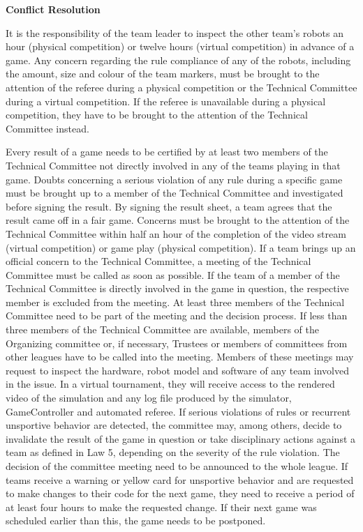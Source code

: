 \bigskip


{\bfseries Conflict Resolution}

\headlinebox

It is the responsibility of the team leader to inspect the other team's
robots an hour (physical competition) or twelve hours (virtual competition) in advance of a game.
Any concern regarding the rule compliance of any of the
robots, including the amount, size and colour of the team markers, must be
brought to the attention of the referee during a physical competition or the Technical Committee during a virtual competition.
If the referee is unavailable during a physical competition, they have to be brought to the attention
  of the Technical Committee instead.



\bigskip

Every result of a game needs to be certified by at least two members of the Technical Committee not directly involved in any of the teams playing in that game.
Doubts concerning a serious violation of any rule during a specific game must be
brought up to a member of the Technical Committee and investigated before
signing the result.
By signing the result sheet, a team agrees that the result came off in
a fair game.
Concerns must be brought to the attention of the Technical Committee
  within half an hour of the completion of the video stream (virtual competition) or game play (physical competition).
If a team brings up an official concern to the Technical Committee, a meeting of
the Technical Committee must be called as soon as possible.
If the team of a member of the Technical Committee is directly involved in the
game in question, the respective member is excluded from the meeting.
At least three members of the Technical Committee need to be part of the meeting
and the decision process.
If less than three members of the Technical Committee are available,
members of the Organizing committee or, if necessary,
Trustees or members of committees from other leagues have to be called into the
meeting.
Members of these meetings may request to inspect the hardware,
robot model and software of any team involved in the issue.
In a virtual tournament, they will receive access to the rendered video of the
  simulation and any log file produced by the simulator, GameController and
  automated referee.
If serious violations of rules or recurrent unsportive behavior
are detected, the committee may, among others, decide to invalidate the result
of the game in question or take disciplinary actions against a team as defined
in Law 5, depending on the severity of the rule violation.
The decision of the committee meeting need to be announced to the whole league.
If teams receive a warning or yellow card for unsportive behavior and are
  requested to make changes to their code for the next game, they need to
  receive a period of at least four hours to make the requested change.
  If their next game was scheduled earlier than this, the game needs to be
  postponed.


